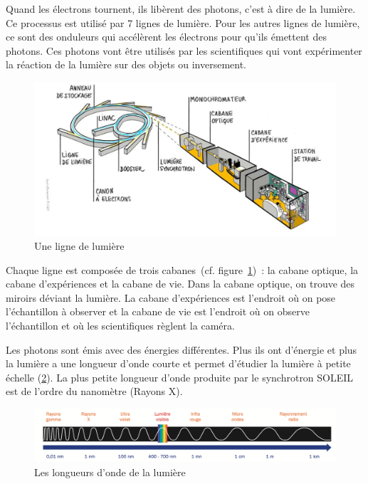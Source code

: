 				Quand les électrons tournent, ils libèrent des photons, c'est à dire de la lumière. Ce processus est utilisé par 7 lignes de lumière. Pour les autres lignes de lumière, ce sont des onduleurs qui accélèrent les électrons pour qu'ils émettent des photons. Ces photons vont être utilisés par les scientifiques qui vont expérimenter la réaction de la lumière sur des objets ou inversement. 
				\begin{figure}[h]
 				 \centering
 				 \includegraphics[width=16cm]{Chapitre1/ImageLigne.png}
 				 \caption{Une ligne de lumière}
 				 \label{Ligne-Lumiere}
				\end{figure}				
				\par Chaque ligne est composée de trois cabanes~(cf. figure~\ref{Ligne-Lumiere})~: la cabane optique, la cabane d'expériences et la cabane de vie. 
				Dans la cabane optique, on trouve des miroirs déviant la lumière. La cabane d'expériences est l'endroit où on pose l'échantillon à observer et la cabane de vie est l'endroit où on observe l'échantillon et où les scientifiques règlent la caméra. 
				
				\par Les photons sont émis avec des énergies différentes. Plus ils ont d'énergie et plus la lumière a une longueur d'onde courte et permet d'étudier la lumière à petite échelle (\ref{Longueur-Onde}). La plus petite longueur d'onde produite par le synchrotron SOLEIL est de l'ordre du nanomètre (Rayons X).

				\begin{figure}[h]
 				 \centering
 				 \includegraphics[width=16cm]{Chapitre1/LongueursOnde.png}
 				 \caption{Les longueurs d'onde de la lumière}
 				 \label{Longueur-Onde}
				\end{figure}				

